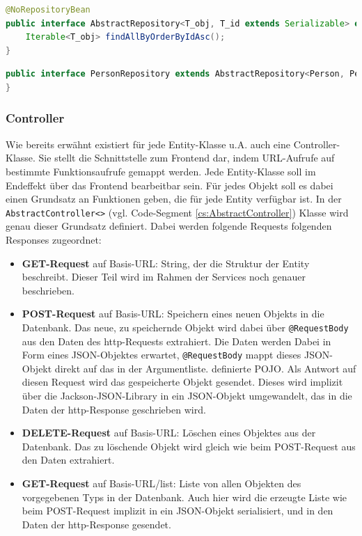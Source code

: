 \scriptsize
\begin{lstlisting}[caption=AbstractRepository.java, label=cs:AbstractRepository, language=Java]
@NoRepositoryBean
public interface AbstractRepository<T_obj, T_id extends Serializable> extends CrudRepository<T_obj, T_id> {
	Iterable<T_obj> findAllByOrderByIdAsc();
}
\end{lstlisting}

\begin{lstlisting}[caption=PersonRepository.java, label=cs:PersonRepository, language=Java]
public interface PersonRepository extends AbstractRepository<Person, PersonId> {
}
\end{lstlisting}
\normalsize

\subsubsection{Controller}

Wie bereits erwähnt existiert für jede Entity-Klasse u.A. auch eine Controller-Klasse. Sie stellt die Schnittstelle zum Frontend dar, indem URL-Aufrufe auf bestimmte Funktionsaufrufe gemappt werden. Jede Entity-Klasse soll im Endeffekt über das Frontend bearbeitbar sein. Für jedes Objekt soll es dabei einen Grundsatz an Funktionen geben, die für jede Entity verfügbar ist. In der \verb|AbstractController<>| (vgl. Code-Segment \ref{cs:AbstractController}) Klasse wird genau dieser Grundsatz definiert. Dabei werden folgende Requests folgenden Responses zugeordnet:

\begin{itemize}
	\item \textbf{GET-Request}  auf Basis-URL: String, der die Struktur der Entity beschreibt. Dieser Teil wird im Rahmen der Services noch genauer beschrieben.
	\item \textbf{POST-Request}  auf Basis-URL: Speichern eines neuen Objekts in die Datenbank. Das neue, zu speichernde Objekt wird dabei über \verb|@RequestBody| aus den Daten des http-Requests extrahiert. Die Daten werden Dabei in Form eines JSON-Objektes erwartet, \verb|@RequestBody| mappt dieses JSON-Objekt direkt auf das in der Argumentliste. definierte POJO. Als Antwort auf diesen Request wird das gespeicherte Objekt gesendet. Dieses wird implizit über die Jackson-JSON-Library in ein JSON-Objekt umgewandelt, das in die Daten der http-Response geschrieben wird.
	\item \textbf{DELETE-Request}  auf Basis-URL: Löschen eines Objektes aus der Datenbank. Das zu löschende Objekt wird gleich wie beim POST-Request aus den Daten extrahiert.
	\item \textbf{GET-Request}  auf Basis-URL/list: Liste von allen Objekten des vorgegebenen Typs in der Datenbank. Auch hier wird die erzeugte Liste wie beim POST-Request implizit in ein JSON-Objekt serialisiert, und in den Daten der http-Response gesendet.
\end{itemize}

